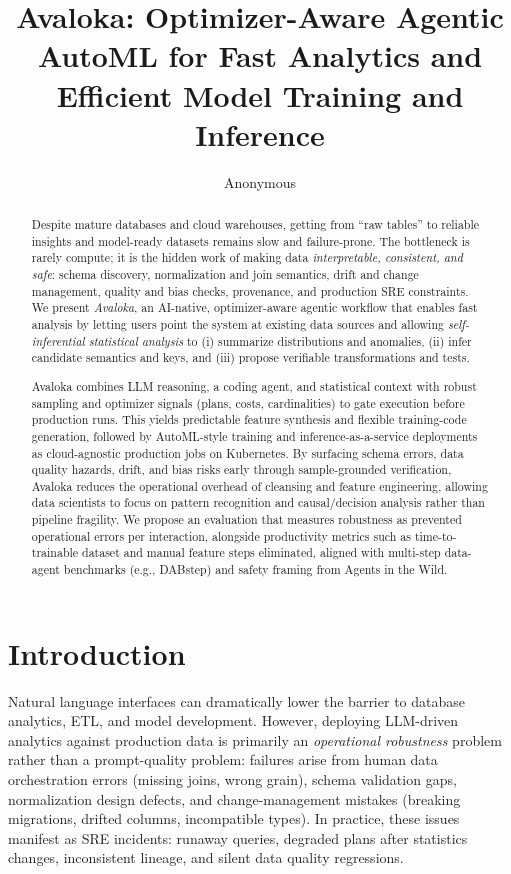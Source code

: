 \documentclass{article} %
\title{Avaloka: Optimizer-Aware Agentic AutoML for Fast Analytics and Efficient Model Training and Inference}
\author{Anonymous}
\begin{document}
\maketitle

\begin{abstract}
Despite mature databases and cloud warehouses, getting from ``raw tables'' to reliable insights and
model-ready datasets remains slow and failure-prone. The bottleneck is rarely compute; it is the
hidden work of making data \emph{interpretable, consistent, and safe}: schema discovery, normalization
and join semantics, drift and change management, quality and bias checks, provenance, and production
SRE constraints. We present \emph{Avaloka}, an AI-native, optimizer-aware agentic workflow that enables
fast analysis by letting users point the system at existing data sources and allowing
\emph{self-inferential statistical analysis} to (i) summarize distributions and anomalies, (ii) infer
candidate semantics and keys, and (iii) propose verifiable transformations and tests.

Avaloka combines LLM reasoning, a coding agent, and statistical context with robust sampling and
optimizer signals (plans, costs, cardinalities) to gate execution before production runs. This yields
predictable feature synthesis and flexible training-code generation, followed by AutoML-style training
and inference-as-a-service deployments as cloud-agnostic production jobs on Kubernetes. By surfacing
schema errors, data quality hazards, drift, and bias risks early through sample-grounded verification,
Avaloka reduces the operational overhead of cleansing and feature engineering, allowing data scientists
to focus on pattern recognition and causal/decision analysis rather than pipeline fragility. We propose
an evaluation that measures robustness as prevented operational errors per interaction, alongside
productivity metrics such as time-to-trainable dataset and manual feature steps eliminated, aligned
with multi-step data-agent benchmarks (e.g., DABstep) and safety framing from Agents in the Wild.
\end{abstract}

\section{Introduction}
Natural language interfaces can dramatically lower the barrier to database analytics, ETL, and model
development. However, deploying LLM-driven analytics against production data is primarily an
\emph{operational robustness} problem rather than a prompt-quality problem: failures arise from
human data orchestration errors (missing joins, wrong grain), schema validation gaps, normalization
design defects, and change-management mistakes (breaking migrations, drifted columns, incompatible
types). In practice, these issues manifest as SRE incidents: runaway queries, degraded plans after
statistics changes, inconsistent lineage, and silent data quality regressions.
\end{document}
